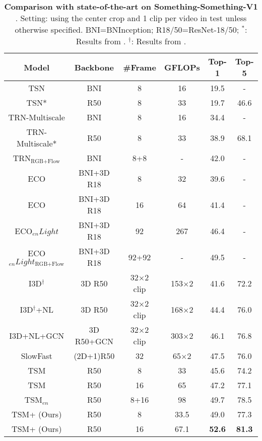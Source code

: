 \documentclass[runningheads]{llncs}
\begin{document}
\begin{table}[h]
\centering
	\begin{tabular}{c|c|c|c|c|c}
		\toprule {\bf Model } & {\bf Backbone } & {\bf \#Frame } & {\bf GFLOPs} & {\bf Top-1 } & {\bf Top-5 } \\\midrule
		TSN \cite{wang2016temporal} & BNI & 8 & 16 & 19.5 & -\\TSN* \cite{wang2016temporal} & R50 & 8 & 33 & 19.7 & 46.6\\TRN-Multiscale \cite{zhou2018temporal} & BNI & 8 & 16 & 34.4 & -\\TRN-Multiscale* \cite{zhou2018temporal} & R50 & 8 & 33 & 38.9 & 68.1\\TRN$_\text{RGB+Flow}$ \cite{zhou2018temporal} & BNI & 8+8 & - & 42.0 & -\\\midrule
		ECO \cite{zolfaghari2018eco} & BNI+3D R18 & 8 & 32 & 39.6 & -\\ECO \cite{zolfaghari2018eco} & BNI+3D R18 & 16 & 64 & 41.4 & -\\ECO$_{en}Light$ \cite{zolfaghari2018eco} & BNI+3D R18 & 92 & 267 & 46.4 & -\\ECO$_{en}Light_\text{RGB+Flow}$ \cite{zolfaghari2018eco} & BNI+3D R18 & 92+92 & - & 49.5 & -\\\midrule
		I3D$^\dagger$ \cite{carreira2017quo} & 3D R50 & 32$\times$2 clip & 153$\times$2 & 41.6 & 72.2 \\I3D$^\dagger$+NL \cite{wang2018non} & 3D R50 & 32$\times$2 clip & 168$\times$2 & 44.4 & 76.0 \\I3D+NL+GCN \cite{wang2018videos} & 3D R50+GCN & 32$\times$2 clip & 303$\times$2 & 46.1 & 76.8 \\SlowFast \cite{feichtenhofer2019slowfast} & (2D+1)R50 & 32 & 65$\times$2 & 47.5 & 76.0 \\\midrule
		TSM \cite{lin2019tsm} & R50 & 8 & 33 & 45.6 & 74.2 \\TSM \cite{lin2019tsm} & R50 & 16 & 65 & 47.2 & 77.1 \\TSM$_{en}$ \cite{lin2019tsm} & R50 & 8+16 & 98 & 49.7 & 78.5\\TSM+{\bf \shortname{}} (Ours)
		& R50 & 8 & 33.5 & 49.0 & 77.3 \\TSM+{\bf \shortname{}} (Ours)
		& R50 & 16 & 67.1 & \bf 52.6 & \bf 81.3\\\bottomrule
	\end{tabular}
	\vspace{.1cm}
	\caption{
	{\bf Comparison with state-of-the-art on Something-Something-V1 \cite{goyal2017something}}.
	Setting: using the center crop and 1 clip per video in test unless otherwise specified.
	BNI=BNInception;
	R18/50=ResNet-18/50;
	$^*$: Results from \cite{lin2019tsm}.
	$^\dagger$: Results from \cite{wang2018videos}.
	}	
	\label{table:SSV1}
\end{table}
\end{document}
